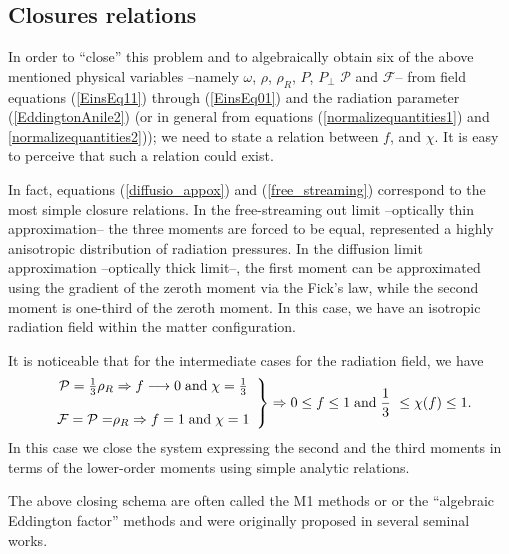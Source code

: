 \documentclass[notitlepage,letterpaper, 10pt]{article}
\begin{document}

\subsection{Closures relations}
In order to ``close'' this problem and to algebraically obtain six of the above mentioned physical variables --namely $\omega$, $\rho$, $\rho_R$, $P$, $P_{\perp}$ $\mathcal{P}$ and $\mathcal{F}$-- from field equations (\ref{EinsEq11}) through (\ref{EinsEq01}) and the radiation parameter (\ref{EddingtonAnile2}) (or in general from equations (\ref{normalizequantities1}) and \ref{normalizequantities2})); we need to state a relation between $f$, and $\chi$. It is easy to perceive that such a relation could exist. 

In fact, equations (\ref{diffusio_appox}) and (\ref{free_streaming}) correspond to the most simple closure relations. In the free-streaming out limit --optically thin approximation-- the three moments are forced to be equal, represented a highly anisotropic distribution of radiation pressures.  In the diffusion limit approximation --optically thick limit--, the first moment can be approximated using the gradient of the zeroth moment via the Fick's law, while the second moment is one-third of the zeroth moment\cite{Pomraning1983}. In this case, we have an isotropic radiation field within the matter configuration. 

It is noticeable that for the intermediate cases for the radiation field, we have
\begin{equation}
\left.
\begin{array}
[c]{c}%
\mathcal{P}=\frac{1}{3}\rho_{R} \Rightarrow f \longrightarrow 0 \; \text{and} \; \chi = \frac{1}{3}\\
\\
\mathcal{F}= \mathcal{P=} \rho_{R} \Rightarrow f = 1 \; \text{and} \; \chi=1
\end{array}
\right\}  \Rightarrow 0 \leq f \leq 1 \; \text{and} \; \frac{1}{3} \ \leq \chi(f) \leq 1. \label{efeji}%
\end{equation}
In this case we close the system expressing the second and the third moments in terms of the lower-order moments using simple analytic relations. 

The above closing schema are often called the M1 methods\cite{SmitVandenHornBludman2000,PonsIbanezMiralles2000,SmitCernohorskyDullemond1997A,SmitCernohorskyDullemond1997B} or or the ``algebraic Eddington factor'' methods \cite{JustObergaulingerJanka2015,MurchikovaAbdikamalovUrbatsch2017} and were originally proposed in several seminal works\cite{Levermore1984,Pomraning1969,Kershaw1976}. 
\end{document}
